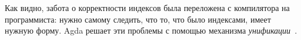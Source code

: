 \begin{code}%
\>  \AgdaSymbol{(} \AgdaSymbol{:} \AgdaSymbol{)} \AgdaSymbol{(} \AgdaSymbol{:} \AgdaSymbol{)} \AgdaSymbol{:}  \<%
\\
\>[0]\<[2]%
\>[2]\AgdaInductiveConstructor{[]} \<[6]%
\>[6]\AgdaSymbol{:} \AgdaSymbol{(}  \AgdaSymbol{)}    \<%
\\
\>[0]\<[2]%
\>[2] \AgdaSymbol{:}  \AgdaSymbol{\{}\AgdaSymbol{\}}  \AgdaSymbol{(}   \AgdaSymbol{)}          \<%
\end{code}

Как видно, забота о корректности индексов была переложена с
компилятора на программиста: нужно самому следить, что то, что было
индексами, имеет нужную форму. Agda решает эти проблемы с помощью
механизма \emph{унификации}~\cite{agda}.

